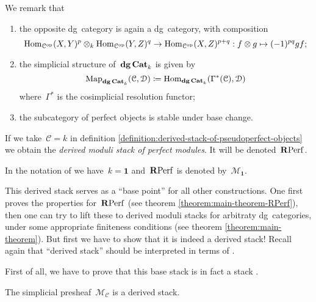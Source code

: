 \begin{refsection}
We remark that
\begin{enumerate}
  \item the opposite dg~category is again a dg~category, with composition
    \begin{equation}
      \mathrm{Hom}_{\mathcal{C}^{\mathrm{op}}}(X,Y)^p\otimes_k\mathrm{Hom}_{\mathcal{C}^{\mathrm{op}}}(Y,Z)^q\to\mathrm{Hom}_{\mathcal{C}^{\mathrm{op}}}(X,Z)^{p+q}:f\otimes g\mapsto(-1)^{pq}gf;
    \end{equation}
  \item the simplicial structure of~$\mathbf{dg\,Cat}_k$ is given by
    \begin{equation}
      \operatorname{\mathrm{Map}}_{\mathbf{dg\,Cat}_k}(\mathcal{C},\mathcal{D})\coloneqq\mathrm{Hom}_{\mathbf{dg\,Cat}_k}(\Gamma^*(\mathcal{C}),\mathcal{D})
    \end{equation}
    where~$\Gamma^*$ is the cosimplicial resolution functor;
  \item the subcategory of perfect objects is stable under base change.
\end{enumerate}

\begin{definition}
  If we take~$\mathcal{C}=k$ in definition \ref{definition:derived-stack-of-pseudoperfect-objects} we obtain the \emph{derived moduli stack of perfect modules}. It will be denoted~$\mathbf{R}\mathrm{Perf}$.
\end{definition}

In the notation of \cite{toen-vaquie} we have~$k=\mathbf{1}$ and~$\mathbf{R}\mathrm{Perf}$ is denoted by~$\mathcal{M}_{\mathbf{1}}$.

This derived stack serves as a ``base point'' for all other constructions. One first proves the properties for~$\mathbf{R}\mathrm{Perf}$ (see theorem \ref{theorem:main-theorem-RPerf}), then one can try to lift these to derived moduli stacks for arbitraty dg~categories, under some appropriate finiteness conditions (see theorem \ref{theorem:main-theorem}). But first we have to show that it is indeed a derived stack! Recall again that ``derived stack'' should be interpreted in terms of \cite[definition 1.3.2.1]{hagII}.

First of all, we have to prove that this base stack is in fact a stack \cite[lemma 3.1]{toen-vaquie}.

\begin{theorem}
  \label{theorem:derived-moduli-stack-is-stack}
  The simplicial presheaf~$\mathcal{M}_{\mathcal{C}}$ is a derived stack.


\end{theorem}
\end{refsection}
